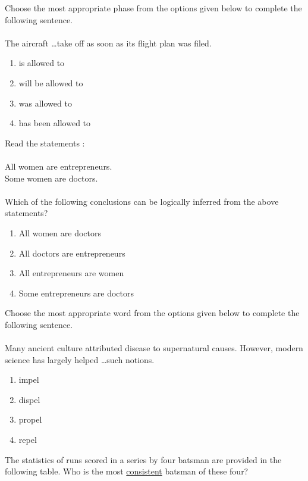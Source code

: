     \item Choose the most appropriate phase from the options given below to complete the following sentence.\\ \\
    The aircraft \dots take off as soon as its flight plan was filed.    
    \begin{enumerate}
        \item is allowed to
        \item will be allowed to
        \item was allowed to
        \item has been allowed to
    \end{enumerate}
    \item Read the statements $\colon$ \\ \\
    All women are entrepreneurs.\\
    Some women are doctors. \\ \\
    Which of the following conclusions can be logically inferred from the above statements?
    \begin{enumerate}
        \item All women are doctors
        \item All doctors are entrepreneurs
        \item All entrepreneurs are women
        \item Some entrepreneurs are doctors
    \end{enumerate}
    \item Choose the most appropriate word from the options given below to complete the following sentence.\\ \\
    Many ancient culture attributed disease to supernatural causes. However, modern science has largely helped \dots such notions.
    \begin{enumerate}
        \item impel
        \item dispel
        \item propel
        \item repel
    \end{enumerate}
    \item The statistics of runs scored in a series by four batsman are provided in the following table. Who is the most \underline{consistent} batsman of these four?
	
